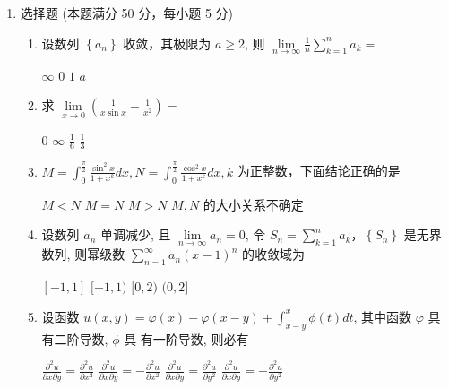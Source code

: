 

\begin{enumerate}
	\item
	选择题 (本题满分 50 分，每小题 5 分)
	\begin{enumerate}
		\item
		设数列 $\left\{a_{n}\right\}$ 收敛，其极限为 $a \geqslant 2$, 则 $\lim\limits _{n \rightarrow \infty} \frac{1}{n} \sum\limits_{k=1}^{n} a_{k}=$  
		
		
\fourchoices
{$\infty$}
{$ 0 $}
{$ 1 $}
{$a$}

\item 
求 $\lim\limits _{x \rightarrow 0}\left(\frac{1}{x \sin x}-\frac{1}{x^{2}}\right)=$  


\fourchoices
{$ 0 $}
{$\infty$}
{$\frac{1}{6}$}
{$\frac{1}{3}$}

\item 
$M=\int_{0}^{\frac{\pi}{2}} \frac{\sin ^{2} x}{1+x^{k}} d x, N=\int_{0}^{\frac{\pi}{2}} \frac{\cos ^{2} x}{1+x^{k}} d x, k$ 为正整数，下面结论正确的是  


\fourchoices
{$M<N$}
{$M=N$}
{$M>N$}
{$M, N$ 的大小关系不确定}

\item 
设数列 $a_{n}$ 单调减少, 且 $\lim\limits _{n \rightarrow \infty} a_{n}=0$, 令 $S_{n}=\sum\limits_{k=1}^{n} a_{k} $，$ \left\{ S_{n} \right\} $ 是无界数列, 则幂级数 $\sum\limits_{n=1}^{\infty} a_{n}(x-1)^{n}$ 的收敛域为 

\fourchoices
{$[-1,1]$}
{$[-1,1)$}
{$[0,2)$}
{$(0,2]$}

\item 
设函数 $u(x, y)=\varphi(x)-\varphi(x-y)+\int_{x-y}^{x} \phi(t) d t$, 其中函数 $\varphi$ 具有二阶导数, $\phi$ 具 有一阶导数, 则必有  


\fourchoices
{$\frac{\partial^{2} u}{\partial x \partial y}=\frac{\partial^{2} u}{\partial x^{2}}$}
{$\frac{\partial^{2} u}{\partial x \partial y}=-\frac{\partial^{2} u}{\partial x^{2}}$}
{$\frac{\partial^{2} u}{\partial x \partial y}=\frac{\partial^{2} u}{\partial y^{2}}$}
{$\frac{\partial^{2} u}{\partial x \partial y}=-\frac{\partial^{2} u}{\partial y^{2}}$}
	

\end{enumerate}
\end{enumerate}
